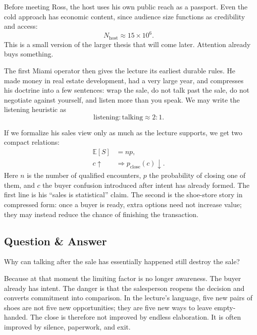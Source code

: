 Before meeting Ross, the host uses his own public reach as a passport. Even the cold approach has economic content, since audience size functions as credibility and access:
\begin{equation}
N_{\text{host}} \approx 15 \times 10^6.
\end{equation}
This is a small version of the larger thesis that will come later. Attention already buys something.

The first Miami operator then gives the lecture its earliest durable rules. He made money in real estate development, had a very large year, and compresses his doctrine into a few sentences: wrap the sale, do not talk past the sale, do not negotiate against yourself, and listen more than you speak. We may write the listening heuristic as
\begin{equation}
\text{listening} : \text{talking} \approx 2:1.
\end{equation}

If we formalize his sales view only as much as the lecture supports, we get two compact relations:
\begin{align}
\mathbb{E}[S] &= np,\\
c \uparrow &\Rightarrow p_{\text{close}}(c)\downarrow.
\end{align}
Here \(n\) is the number of qualified encounters, \(p\) the probability of closing one of them, and \(c\) the buyer confusion introduced after intent has already formed. The first line is his ``sales is statistical'' claim. The second is the shoe-store story in compressed form: once a buyer is ready, extra options need not increase value; they may instead reduce the chance of finishing the transaction.

\subsection{Question \& Answer}

Why can talking after the sale has essentially happened still destroy the sale?

Because at that moment the limiting factor is no longer awareness. The buyer already has intent. The danger is that the salesperson reopens the decision and converts commitment into comparison. In the lecture's language, five new pairs of shoes are not five new opportunities; they are five new ways to leave empty-handed. The close is therefore not improved by endless elaboration. It is often improved by silence, paperwork, and exit.

